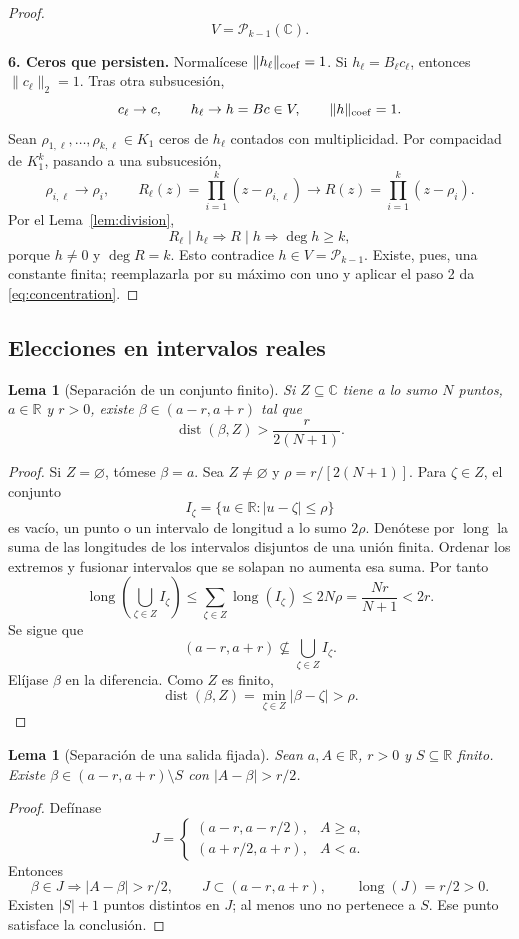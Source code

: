 \documentclass[11pt,a4paper]{article}
\numberwithin{equation}{section}
\newtheorem{lemma}[theorem]{Lema}
\theoremstyle{definition}
\theoremstyle{remark}
\newcommand{\R}{\mathbb R}
\newcommand{\C}{\mathbb C}
\newcommand{\PP}{\mathcal P}
\DeclareMathOperator{\dist}{dist}
\newcommand{\paso}[1]{\par\smallskip\noindent\textbf{#1}\quad}
\begin{document}
\begin{proof}
\[
V=\PP_{k-1}(\C).
\]
\paso{6. Ceros que persisten.}
Normalícese $\|h_\ell\|_{\rm coef}=1$. Si $h_\ell=B_\ell c_\ell$, entonces $\|c_\ell\|_2=1$. Tras otra subsucesión,
\[
c_\ell\to c,\qquad h_\ell\to h=Bc\in V,\qquad\|h\|_{\rm coef}=1.
\]
Sean $\rho_{1,\ell},\ldots,\rho_{k,\ell}\in K_1$ ceros de $h_\ell$ contados con multiplicidad. Por compacidad de $K_1^k$, pasando a una subsucesión,
\[
\rho_{i,\ell}\to\rho_i,\qquad
R_\ell(z)=\prod_{i=1}^k(z-\rho_{i,\ell})\longrightarrow R(z)=\prod_{i=1}^k(z-\rho_i).
\]
Por el Lema~\ref{lem:division},
\[
R_\ell\mid h_\ell\Longrightarrow R\mid h
\Longrightarrow\deg h\ge k,
\]
porque $h\ne0$ y $\deg R=k$. Esto contradice $h\in V=\PP_{k-1}$. Existe, pues, una constante finita; reemplazarla por su máximo con uno y aplicar el paso 2 da \eqref{eq:concentration}.
\end{proof}

\subsection{Elecciones en intervalos reales}
\begin{lemma}[Separación de un conjunto finito]\label{lem:finite}
Si $Z\subseteq\C$ tiene a lo sumo $N$ puntos, $a\in\R$ y $r>0$, existe $\beta\in(a-r,a+r)$ tal que
\[
\dist(\beta,Z)>\frac{r}{2(N+1)}.
\]
\end{lemma}
\begin{proof}
Si $Z=\varnothing$, tómese $\beta=a$. Sea $Z\ne\varnothing$ y $\rho=r/[2(N+1)]$.
Para $\zeta\in Z$, el conjunto
\[
I_\zeta=\{u\in\R:|u-\zeta|\le\rho\}
\]
es vacío, un punto o un intervalo de longitud a lo sumo $2\rho$. Denótese por $\operatorname{long}$ la suma de las longitudes de los intervalos disjuntos de una unión finita. Ordenar los extremos y fusionar intervalos que se solapan no aumenta esa suma. Por tanto
\[
\operatorname{long}\left(\bigcup_{\zeta\in Z}I_\zeta\right)
\le\sum_{\zeta\in Z}\operatorname{long}(I_\zeta)
\le2N\rho=\frac{Nr}{N+1}<2r.
\]
Se sigue que
\[
(a-r,a+r)\not\subseteq\bigcup_{\zeta\in Z}I_\zeta.
\]
Elíjase $\beta$ en la diferencia. Como $Z$ es finito,
\[
\dist(\beta,Z)=\min_{\zeta\in Z}|\beta-\zeta|>\rho.
\]
\end{proof}

\begin{lemma}[Separación de una salida fijada]\label{lem:outputsep}
Sean $a,A\in\R$, $r>0$ y $S\subseteq\R$ finito. Existe $\beta\in(a-r,a+r)\setminus S$ con $|A-\beta|>r/2$.
\end{lemma}
\begin{proof}
Defínase
\[
J=\begin{cases}(a-r,a-r/2),&A\ge a,\\(a+r/2,a+r),&A<a.
\end{cases}
\]
Entonces
\[
\beta\in J\Longrightarrow |A-\beta|>r/2,
\qquad J\subset(a-r,a+r),\qquad\operatorname{long}(J)=r/2>0.
\]
Existen $|S|+1$ puntos distintos en $J$; al menos uno no pertenece a $S$. Ese punto satisface la conclusión.
\end{proof}
\end{document}
